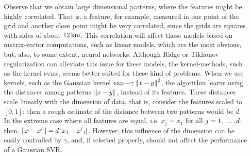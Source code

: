 %
Observe that we obtain large dimensional patterns, where the features might be highly correlated. That is, a feature,  for example, measured in one point of the grid and another close point might be very correlated, since the grids are squares with sides of about $\SI{12}{\kilo\metre}$.
This correlation will affect those models based on matrix-vector computations, such as linear models, which are the most obvious, but, also, to some extent, neural networks.
Although Ridge or Tikhonov regularization can alleviate this issue for these models, the kernel-methods, such as the kernel \acrshort{svm}s, seems better suited for these kind of problems.
When we use kernels, such as the Gaussian kernel $\exp{-\gamma \left\lVert x-y\right\rVert^2}$, the algorithm learns using the distances among patterns $\left\lVert x - y\right\rVert$, instead of its features.
%
These distances scale linearly with the dimension of data, that is, consider the features scaled to $[0, 1]$; then a rough estimate of the distance between two patterns would be $d$. In the extreme case where all features are equal, i.e. $x_j = x_1$ for all $j=1, \ldots, d$; then, $\left\lVert x - x'\right\rVert = d \left|x_1 - {x'}_1\right| $.
However, this influence of the dimension can be easily controlled by $\gamma$, and, if selected properly, should not affect the performance of a Gaussian SVR.

